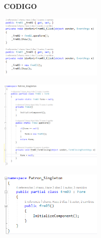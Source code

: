\documentclass[twoside,twocolumn]{article}
\begin{document}
    \item \textbf{CODIGO}
    \begin{center}
        \includegraphics[width=5cm]{./img/Singleton1.png} 
    \end{center}
    \begin{center}
        \includegraphics[width=5cm]{./img/Singleton2.png} 
    \end{center}
    \begin{center}
        \includegraphics[width=5cm]{./img/Singleton3.png} 
    \end{center}
	
\end{document}
